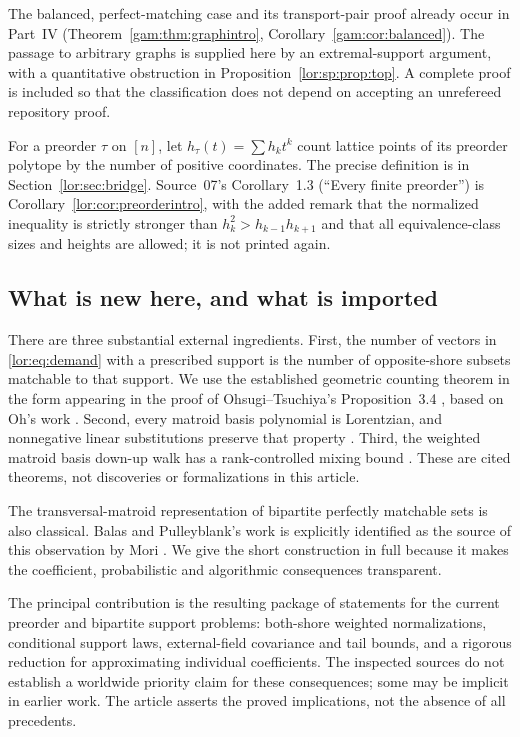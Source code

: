 \documentclass[11pt]{article}
\numberwithin{equation}{section}
\theoremstyle{definition}
\begin{document}
The balanced, perfect-matching case and its transport-pair proof already occur
in Part~IV (Theorem~\ref{gam:thm:graphintro}, Corollary~\ref{gam:cor:balanced}). The passage to arbitrary graphs is supplied here by
an extremal-support argument, with a quantitative obstruction in
Proposition~\ref{lor:sp:prop:top}. A complete proof is included so that the classification does
not depend on accepting an unrefereed repository proof.

For a preorder $\tau$ on $[n]$, let $h_\tau(t)=\sum h_k t^k$ count lattice
points of its preorder polytope by the number of positive coordinates. The
precise definition is in Section~\ref{lor:sec:bridge}.
Source~07's Corollary~1.3 (``Every finite preorder'') is
Corollary~\ref{lor:cor:preorderintro}, with the added remark that the
normalized inequality is strictly stronger than
$h_k^2>h_{k-1}h_{k+1}$ and that all equivalence-class sizes and heights are
allowed; it is not printed again.

\subsection{What is new here, and what is imported}
There are three substantial external ingredients. First, the number of
vectors in \eqref{lor:eq:demand} with a prescribed support is the number of
opposite-shore subsets matchable to that support. We use the established
geometric counting theorem in the form appearing in the proof of
Ohsugi--Tsuchiya's Proposition~3.4 \cite{OT20}, based on Oh's work \cite{Oh}.
Second, every matroid basis polynomial is Lorentzian, and nonnegative linear
substitutions preserve that property \cite{BH}. Third, the weighted
matroid basis down-up walk has a rank-controlled mixing bound \cite{ALOV}.
These are cited theorems, not discoveries or formalizations in this article.

The transversal-matroid representation of bipartite perfectly matchable
sets is also classical. Balas and Pulleyblank's work \cite{BP} is explicitly
identified as the source of this observation by Mori \cite{Mori}. We give
the short construction in full because it makes the coefficient,
probabilistic and algorithmic consequences transparent.

The principal contribution is the resulting package of statements for the
current preorder and bipartite support problems: both-shore weighted
normalizations, conditional support laws, external-field covariance and
tail bounds, and a rigorous reduction for approximating individual
coefficients. The inspected sources do not establish a worldwide priority
claim for these consequences; some may be implicit in earlier work. The
article asserts the proved implications, not the absence of all precedents.
\end{document}
